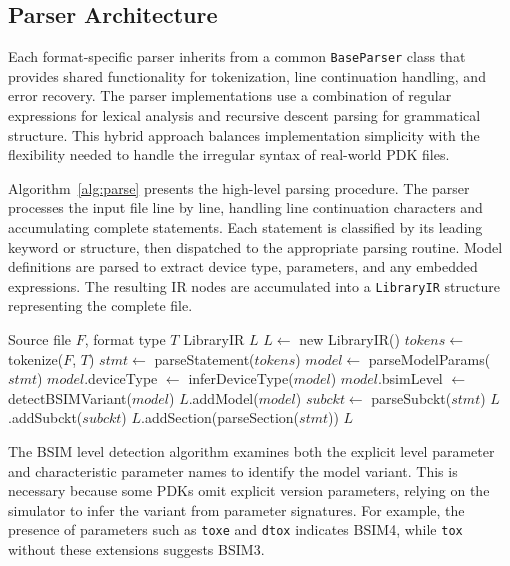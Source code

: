 \documentclass[conference]{IEEEtran}
\begin{document}
\subsection{Parser Architecture}

Each format-specific parser inherits from a common \texttt{BaseParser} class that provides shared functionality for tokenization, line continuation handling, and error recovery. The parser implementations use a combination of regular expressions for lexical analysis and recursive descent parsing for grammatical structure. This hybrid approach balances implementation simplicity with the flexibility needed to handle the irregular syntax of real-world PDK files.

Algorithm~\ref{alg:parse} presents the high-level parsing procedure. The parser processes the input file line by line, handling line continuation characters and accumulating complete statements. Each statement is classified by its leading keyword or structure, then dispatched to the appropriate parsing routine. Model definitions are parsed to extract device type, parameters, and any embedded expressions. The resulting IR nodes are accumulated into a \texttt{LibraryIR} structure representing the complete file.

\begin{algorithm}[!t]
\caption{Model Library Parsing}
\label{alg:parse}
\begin{algorithmic}[1]
\REQUIRE Source file $F$, format type $T$
\ENSURE LibraryIR $L$
\STATE $L \gets$ new LibraryIR()
\STATE $tokens \gets$ tokenize($F$, $T$)
    \STATE $stmt \gets$ parseStatement($tokens$)
        \STATE $model \gets$ parseModelParams($stmt$)
        \STATE $model$.deviceType $\gets$ inferDeviceType($model$)
        \STATE $model$.bsimLevel $\gets$ detectBSIMVariant($model$)
        \STATE $L$.addModel($model$)
        \STATE $subckt \gets$ parseSubckt($stmt$)
        \STATE $L$.addSubckt($subckt$)
        \STATE $L$.addSection(parseSection($stmt$))
    \ENDIF
\ENDWHILE
\RETURN $L$
\end{algorithmic}
\end{algorithm}

The BSIM level detection algorithm examines both the explicit level parameter and characteristic parameter names to identify the model variant. This is necessary because some PDKs omit explicit version parameters, relying on the simulator to infer the variant from parameter signatures. For example, the presence of parameters such as \texttt{toxe} and \texttt{dtox} indicates BSIM4, while \texttt{tox} without these extensions suggests BSIM3.
\end{document}
